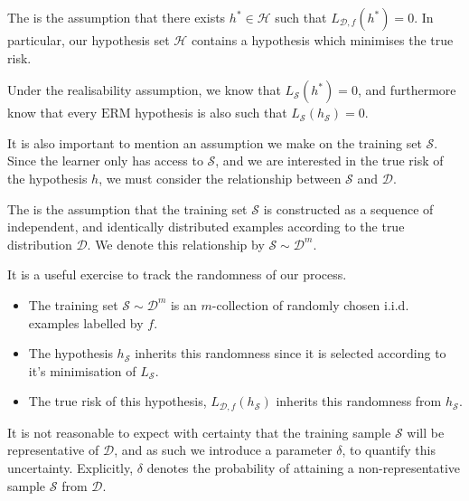 \begin{definition}[Realisability]
	The  is the assumption that there exists $ h ^{*} \in \mathcal{H} $ such that $ L_{\mathcal{D}, f}( h ^{*} ) = 0 $. In particular, our hypothesis set $ \mathcal{H} $ contains a hypothesis which minimises the true risk.
\end{definition}

Under the realisability assumption, we know that $ L_{\mathcal{S}}( h ^{*} ) = 0 $, and furthermore know that every $ \mathrm{ERM} $ hypothesis is also such that $ L_{\mathcal{S}}( h_{\mathcal{S}} ) = 0 $.

It is also important to mention an assumption we make on the training set $ \mathcal{S} $. Since the learner only has access to $ \mathcal{S} $, and we are interested in the true risk of the hypothesis $ h $, we must consider the relationship between $ \mathcal{S} $ and $ \mathcal{D} $.

\begin{definition}
	The  is the assumption that the training set $ \mathcal{S} $ is constructed as a sequence of independent, and identically distributed examples according to the true distribution $ \mathcal{D} $. We denote this relationship by $ \mathcal{S} \sim \mathcal{D}^{m} $.
\end{definition}

\begin{remark}
	It is a useful exercise to track the randomness of our process.
	\begin{itemize}
		\item The training set $ \mathcal{S} \sim \mathcal{D}^{m} $ is an $ m $-collection of randomly chosen i.i.d. examples labelled by $ f $.
		\item The hypothesis $ h_{\mathcal{S}} $ inherits this randomness since it is selected according to it's minimisation of $ L_{\mathcal{S}} $.
		\item The true risk of this hypothesis, $ L_{\mathcal{D}, f}( h_{\mathcal{S}} ) $ inherits this randomness from $ h_{\mathcal{S}} $.
	\end{itemize}

	It is not reasonable to expect with certainty that the training sample $ \mathcal{S} $ will be representative of $ \mathcal{D} $, and as such we introduce a parameter $ \delta $, to quantify this uncertainty. Explicitly, $ \delta $ denotes the probability of attaining a non-representative sample $ \mathcal{S} $ from $ \mathcal{D} $.
\end{remark}

